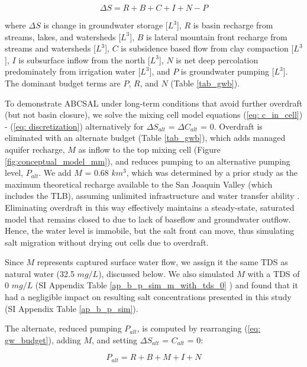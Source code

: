 \begin{equation}
\Delta S = R + B + C + I + N - P
\label{eq: gw_budget}
\end{equation}

where $\Delta S$ is change in groundwater storage [$L^3$], $R$ is basin recharge from streams, lakes, and watersheds [$L^3$], $B$ is lateral mountain front recharge from streams and watersheds [$L^3$], $C$ is subsidence based flow from clay compaction [$L^3$], $I$ is subsurface inflow from the north [$L^3$], $N$ is net deep percolation predominately from irrigation water [$L^3$], and $P$ is groundwater pumping [$L^3$]. The dominant budget terms are $P$, $R$, and $N$ (Table \ref{tab_gwb}). 

To demonstrate ABCSAL under long-term conditions that avoid further overdraft (but not basin closure), we solve the mixing cell model equations (\ref{eq: c_in_cell}) - (\ref{eq: discretization}) alternatively for $\Delta S_{alt}$ = $\Delta C_{alt}$ = 0. Overdraft is eliminated with an alternate budget (Table \ref{tab_gwb}), which adds managed aquifer recharge, $M$ as inflow to the top mixing cell (Figure \ref{fig:conceptual_model_mm}), and reduces pumping to an alternative pumping level, $P_{alt}$. We add $M$ = 0.68 $km^3$, which was determined by a prior study as the maximum theoretical recharge available to the San Joaquin Valley (which includes the TLB), assuming unlimited infrastructure and water transfer ability \citep{Hanak2019}. Eliminating overdraft in this way effectively maintains a steady-state, saturated model that remains closed to due to lack of baseflow and groundwater outflow. Hence, the water level is immobile, but the salt front can move, thus simulating salt migration without drying out cells due to overdraft.

Since $M$ represents captured surface water flow, we assign it the same TDS as natural water (32.5 $mg/L$), discussed below. We also simulated $M$ with a TDS of 0 $mg/L$ (SI Appendix Table \ref{ap_b_p_sim_m_with_tds_0}
) and found that it had a negligible impact on resulting salt concentrations presented in this study (SI Appendix Table \ref{ap_b_p_sim}). 

The alternate, reduced pumping $P_{alt}$, is computed by rearranging (\ref{eq: gw_budget}), adding $M$, and setting $\Delta S_{alt}$ = $C_{alt}$ = 0:

\begin{equation}
P_{alt} = R + B + M + I + N 
\label{eq: p_alt}
\end{equation}

